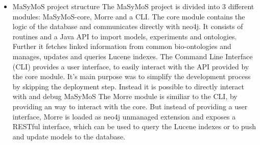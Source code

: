 \begin{itemize}
	\item MaSyMoS project structure
	\subitem The MaSyMoS project is divided into 3 different modules: MaSyMoS-core, Morre and a CLI.
	\subitem The core module contains the logic of the database and communicates directly with neo4j. It consists of routines and a Java API to import models, experiments and ontologies. Further it fetches linked information from common bio-ontologies and manages, updates and queries Lucene indexes.
	\subitem The Command Line Interface (CLI) provides a user interface, to easily interact with the API provided by the core module. It's main purpose was to simplify the development process by skipping the deployment step. Instead it is possible to directly interact with and debug MaSyMoS
	\subitem The Morre module is similiar to the CLI, by providing an way to interact with the core. But instead of providing a user interface, Morre is loaded as neo4j unmanaged extension and exposes a RESTful interface, which can be used to query the Lucene indexes or to push and update models to the database.
\end{itemize}

